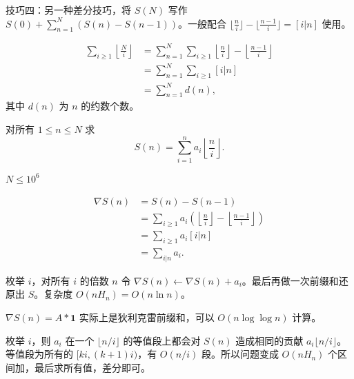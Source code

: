     技巧四：另一种差分技巧，将 $S(N)$ 写作 $S(0)+\sum_{n=1}^N(S(n)-S(n-1))$。一般配合 $\lfloor\frac{n}{i}\rfloor-\lfloor\frac{n-1}{i}\rfloor=[i|n]$ 使用。

    \begin{example}
        $$
        \begin{aligned}
        \sum_{i\ge 1}\left\lfloor\frac{N}{i}\right\rfloor&=\sum_{n=1}^N \sum_{i\ge 1}\left\lfloor\frac{n}{i}\right\rfloor-\left\lfloor\frac{n-1}{i}\right\rfloor\\
        &=\sum_{n=1}^N \sum_{i\ge 1}[i|n]\\
        &=\sum_{n=1}^N d(n),
        \end{aligned}
        $$
        其中 $d(n)$ 为 $n$ 的约数个数。
    \end{example}

    \begin{example}
    对所有 $1\le n\le N$ 求
    $$
    S(n)=\sum_{i=1}^n a_i\left\lfloor\frac{n}{i}\right\rfloor.
    $$ 

    $N\le 10^6$
    \end{example}
\begin{solution}
    $$
    \begin{aligned}
    \nabla S(n)&=S(n)-S(n-1)\\
    &=\sum_{i\ge 1}a_i\left(\left\lfloor\frac{n}{i}\right\rfloor-\left\lfloor\frac{n-1}{i}\right\rfloor\right)\\
    &=\sum_{i\ge 1}a_i[i|n]\\
    &=\sum_{i|n}a_i.
    \end{aligned}
    $$

    枚举 $i$，对所有 $i$ 的倍数 $n$ 令 $\nabla S(n)\leftarrow \nabla S(n)+a_i$。最后再做一次前缀和还原出 $S$。复杂度 $O(nH_n)=O(n\ln n)$。
\end{solution}
\begin{remark}
    $\nabla S(n)=A\ast \mathbf 1$ 实际上是狄利克雷前缀和，可以 $O(n\log\log n)$ 计算。
\end{remark}
\begin{solution}[另解]
    枚举 $i$，则 $a_i$ 在一个 $\lfloor n/i\rfloor$ 的等值段上都会对 $S(n)$ 造成相同的贡献 $a_i\lfloor n/i\rfloor$。等值段为所有的 $[ki,(k+1)i)$，有 $O(n/i)$ 段。所以问题变成 $O(nH_n)$ 个区间加，最后求所有值，差分即可。
\end{solution}


